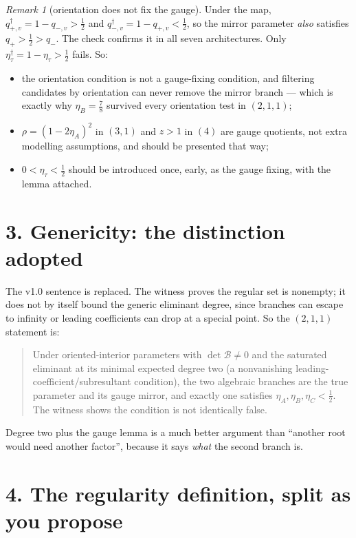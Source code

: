 \documentclass[11pt]{article}
\theoremstyle{remark}
\newtheorem*{remark}{Remark}
\begin{document}
\begin{remark}[orientation does not fix the gauge]
Under the map, $q^\dagger_{+,v}=1-q_{-,v}>\tfrac12$ and $q^\dagger_{-,v}=1-q_{+,v}<\tfrac12$, so the mirror parameter \emph{also} satisfies $q_+>\tfrac12>q_-$. The check confirms it in all seven architectures. Only $\eta^\dagger_\tau=1-\eta_\tau>\tfrac12$ fails. So:
\begin{itemize}
\item the orientation condition is not a gauge-fixing condition, and filtering candidates by orientation can never remove the mirror branch --- which is exactly why $\eta_B=\tfrac78$ survived every orientation test in $(2,1,1)$;
\item $\rho=(1-2\eta_A)^2$ in $(3,1)$ and $z>1$ in $(4)$ are gauge quotients, not extra modelling assumptions, and should be presented that way;
\item $0<\eta_\tau<\tfrac12$ should be introduced once, early, as the gauge fixing, with the lemma attached.
\end{itemize}
\end{remark}

\section*{3. Genericity: the distinction adopted}

The v1.0 sentence is replaced. The witness proves the regular set is nonempty; it does not by itself bound the generic eliminant degree, since branches can escape to infinity or leading coefficients can drop at a special point. So the $(2,1,1)$ statement is:
\begin{quote}
Under oriented-interior parameters with $\det\mathcal B\neq0$ and the saturated eliminant at its minimal expected degree two (a nonvanishing leading-coefficient/subresultant condition), the two algebraic branches are the true parameter and its gauge mirror, and exactly one satisfies $\eta_A,\eta_B,\eta_C<\tfrac12$. The witness shows the condition is not identically false.
\end{quote}
Degree two plus the gauge lemma is a much better argument than ``another root would need another factor'', because it says \emph{what} the second branch is.

\section*{4. The regularity definition, split as you propose}
\end{document}

